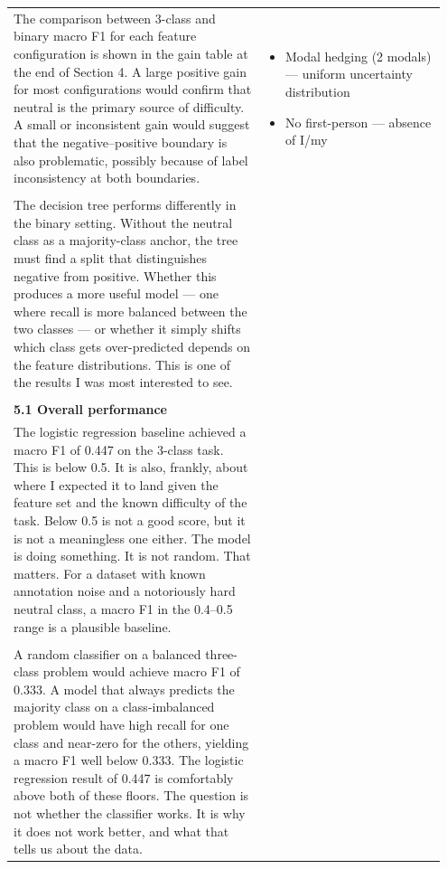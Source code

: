 \documentclass[11pt]{article}
\begin{document}
\begin{longtable}{|p{0.55\linewidth}|p{0.40\linewidth}|}
\hline
\rule[-3.5cm]{0pt}{3.5cm} & \\
\hline
The comparison between 3-class and binary macro F1 for each feature configuration is shown in the gain table at the end of Section 4. A large positive gain for most configurations would confirm that neutral is the primary source of difficulty. A small or inconsistent gain would suggest that the negative--positive boundary is also problematic, possibly because of label inconsistency at both boundaries. & \begin{itemize}[leftmargin=1em,itemsep=1pt,topsep=1pt,parsep=0pt]
  \item Modal hedging (2 modals) --- uniform uncertainty distribution
  \item No first-person --- absence of I/my
\end{itemize} \\[2pt]
\hline
\rule[-3.5cm]{0pt}{3.5cm} & \\
\hline
The decision tree performs differently in the binary setting. Without the neutral class as a majority-class anchor, the tree must find a split that distinguishes negative from positive. Whether this produces a more useful model --- one where recall is more balanced between the two classes --- or whether it simply shifts which class gets over-predicted depends on the feature distributions. This is one of the results I was most interested to see. &  \\[2pt]
\hline
\rule[-3.5cm]{0pt}{3.5cm} & \\
\hline
\textbf{5.1 Overall performance}\\[4pt]
The logistic regression baseline achieved a macro F1 of 0.447 on the 3-class task. This is below 0.5. It is also, frankly, about where I expected it to land given the feature set and the known difficulty of the task. Below 0.5 is not a good score, but it is not a meaningless one either. The model is doing something. It is not random. That matters. For a dataset with known annotation noise and a notoriously hard neutral class, a macro F1 in the 0.4--0.5 range is a plausible baseline. &  \\[2pt]
\hline
\rule[-3.5cm]{0pt}{3.5cm} & \\
\hline
A random classifier on a balanced three-class problem would achieve macro F1 of 0.333. A model that always predicts the majority class on a class-imbalanced problem would have high recall for one class and near-zero for the others, yielding a macro F1 well below 0.333. The logistic regression result of 0.447 is comfortably above both of these floors. The question is not whether the classifier works. It is why it does not work better, and what that tells us about the data. & \begin{itemize}[leftmargin=1em,itemsep=1pt,topsep=1pt,parsep=0pt]

\end{itemize}
\end{longtable}
\end{document}
